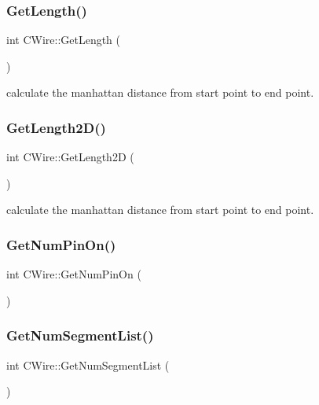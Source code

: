\mbox{\label{classCWire_a063474510062c4cd858fb5bfc04daffb}} 
\subsubsection{\texorpdfstring{GetLength()}{GetLength()}}
{\footnotesize\ttfamily int C\+Wire\+::\+Get\+Length (\begin{DoxyParamCaption}{ }\end{DoxyParamCaption})}

calculate the manhattan distance from start point to end point. \mbox{\label{classCWire_a54f754e7404cb275e2eed0e8b281817f}} 
\subsubsection{\texorpdfstring{GetLength2D()}{GetLength2D()}}
{\footnotesize\ttfamily int C\+Wire\+::\+Get\+Length2D (\begin{DoxyParamCaption}{ }\end{DoxyParamCaption})}

calculate the manhattan distance from start point to end point. \mbox{\label{classCWire_a095a9358f9fe790d5010fef23a8a209e}} 
\subsubsection{\texorpdfstring{GetNumPinOn()}{GetNumPinOn()}}
{\footnotesize\ttfamily int C\+Wire\+::\+Get\+Num\+Pin\+On (\begin{DoxyParamCaption}{ }\end{DoxyParamCaption})}

\mbox{\label{classCWire_a715cef9442c9cc6b45259c7291b84209}} 
\subsubsection{\texorpdfstring{GetNumSegmentList()}{GetNumSegmentList()}}
{\footnotesize\ttfamily int C\+Wire\+::\+Get\+Num\+Segment\+List (\begin{DoxyParamCaption}{ }\end{DoxyParamCaption})}

